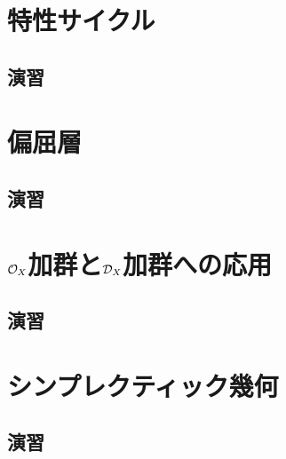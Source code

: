 \chapter{特性サイクル}\label{chap9}
\section*{演習}
\chapter{偏屈層}\label{chap10}
\section*{演習}
\chapter{\(\mathcal{O}_X\)加群と\(\mathcal{D}_X\)加群への応用}\label{chap11}
\section*{演習}
\appendix
\chapter{シンプレクティック幾何}\label{chapA}
\section*{演習}
























